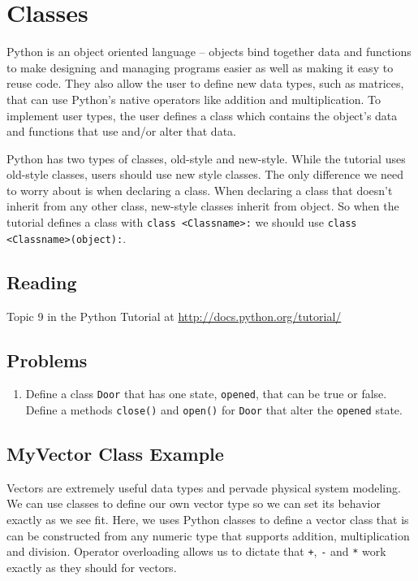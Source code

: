 \section{Classes}
Python is an object oriented language -- objects bind together data and functions to make designing and managing programs easier as well as making it easy to reuse code. They also allow the user to define new data types, such as matrices, that can use Python's native operators like addition and multiplication. To implement user types, the user defines a \gls{class} which contains the object's data and functions that use and/or alter that data.

Python has two types of classes, old-style and new-style. While the tutorial uses old-style classes, users should use new style classes. The only difference we need to worry about is when declaring a class. When declaring a class that doesn't inherit from any other class, new-style classes inherit from object. So when the tutorial defines a class with \verb|class <Classname>:| we should use \verb|class <Classname>(object):|.

\subsection{Reading}
Topic 9 in the Python Tutorial at \url{http://docs.python.org/tutorial/} \cite{website:Python272docs}
\subsection{Problems}
\begin{enumerate}
	\item Define a class \verb|Door| that has one state, \verb|opened|, that can be true or false. Define a methods \verb|close()| and \verb|open()| for \verb|Door| that alter the \verb|opened| state. 
\end{enumerate}
\subsection{MyVector Class Example}



Vectors are extremely useful data types and pervade physical system modeling. We can use classes to define our own vector type so we can set its behavior exactly as we see fit. Here, we uses Python classes to define a vector class that is can be constructed from any numeric type that supports addition, multiplication and division. Operator overloading allows us to dictate that \verb|+|, \verb|-| and \verb|*| work exactly as they should for vectors.

